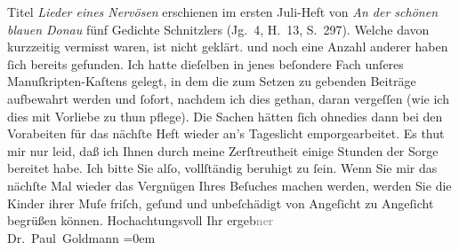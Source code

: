 \begin{ledgroupsized}[t]{13cm}
{{{                  Titel \emph{Lieder eines Nervösen} erschienen im
                  ersten Juli-Heft von \emph{An der schönen blauen
                     Donau} fünf Gedichte Schnitzlers
                     (Jg. 4, H. 13, S. 297). Welche davon kurzzeitig vermisst waren,
                  ist nicht geklärt.}}}\label{K_L02640-1h} und noch eine Anzahl anderer haben ſich bereits
               gefunden. Ich hatte dieſelben in jenes beſondere Fach unſeres Manuſkripten-Kaſtens
               gelegt, in dem die zum Setzen zu gebenden Beiträge aufbewahrt werden und ſofort,
               nachdem ich dies gethan, daran vergeſſen (wie ich dies mit {\pb}Vorliebe zu thun pflege). Die Sachen hätten ſich
               ohnedies dann bei den Vorabeiten für das nächſte Heft wieder an’s Tageslicht emporgearbeitet. Es
               thut mir nur leid, daß ich Ihnen durch meine Zerſtreutheit einige Stunden der Sorge
               bereitet habe. Ich bitte Sie alſo, vollſtändig beruhigt \introOben{}zu\introOben{}
               ſein. Wenn Sie mir das nächſte Mal wieder das Vergnügen Ihres Beſuches machen werden,
               werden Sie die Kinder ihrer
                  Muſe friſch, geſund und unbeſchädigt von Angeſicht zu Angeſicht begrüßen
               können. Hochachtungsvoll\pend
           \pstart
           Ihr ergeb\textcolor{gray}{ner}{\\[\baselineskip]}\spacefill\mbox{Dr. Paul Goldmann}\pend
           \leftskip=0em{}
         
         \endnumbering{}\end{ledgroupsized}  \newcommand{\dateiname}{L02640}\newcommand{\titel}{Paul Goldmann an Arthur Schnitzler, 18. 6. 1889}\newcommand{\editorInnen}{Martin Anton Müller und Laura Untner}
      